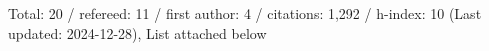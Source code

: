Total: 20 / refereed: 11 / first author: 4 / citations: 1,292 / h-index: 10 (Last updated: 2024-12-28), List attached below